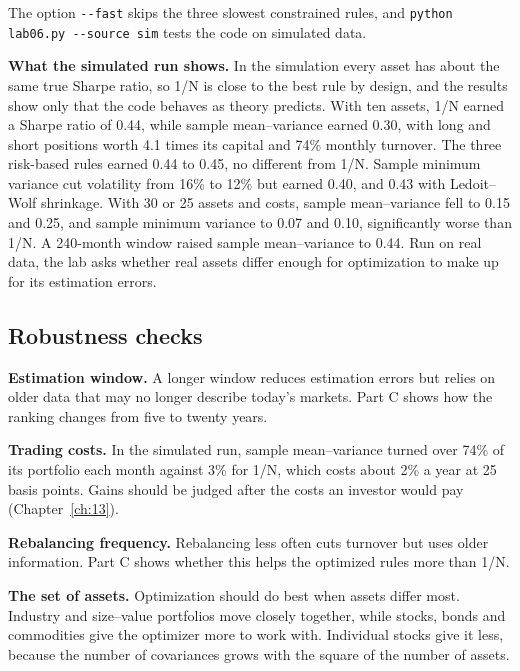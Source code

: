 {\sloppy The option \texttt{-{}-fast} skips the three slowest constrained rules, and \texttt{python lab06.py -{}-source sim} tests the code on simulated data.\par}

\textbf{What the simulated run shows.} In the simulation every asset has about the same true Sharpe ratio, so 1/N is close to the best rule by design, and the results show only that the code behaves as theory predicts. With ten assets, 1/N earned a Sharpe ratio of 0.44, while sample mean--variance earned 0.30, with long and short positions worth 4.1 times its capital and 74\% monthly turnover. The three risk-based rules earned 0.44 to 0.45, no different from 1/N. Sample minimum variance cut volatility from 16\% to 12\% but earned 0.40, and 0.43 with Ledoit--Wolf shrinkage. With 30 or 25 assets and costs, sample mean--variance fell to 0.15 and 0.25, and sample minimum variance to 0.07 and 0.10, significantly worse than 1/N. A 240-month window raised sample mean--variance to 0.44. Run on real data, the lab asks whether real assets differ enough for optimization to make up for its estimation errors.

\subsection{Robustness checks}
\label{sec:12-stress}

\textbf{Estimation window.} A longer window reduces estimation errors but relies on older data that may no longer describe today's markets. Part C shows how the ranking changes from five to twenty years.

\textbf{Trading costs.} In the simulated run, sample mean--variance turned over 74\% of its portfolio each month against 3\% for 1/N, which costs about 2\% a year at 25 basis points. Gains should be judged after the costs an investor would pay (Chapter~\ref{ch:13}).

\textbf{Rebalancing frequency.} Rebalancing less often cuts turnover but uses older information. Part C shows whether this helps the optimized rules more than 1/N.

\textbf{The set of assets.} Optimization should do best when assets differ most. Industry and size--value portfolios move closely together, while stocks, bonds and commodities give the optimizer more to work with. Individual stocks give it less, because the number of covariances grows with the square of the number of assets.

